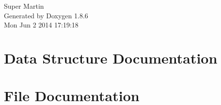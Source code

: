 \documentclass[twoside]{article}
\begin{document}
\hypersetup{pageanchor=false}
\begin{titlepage}
\vspace*{7cm}
\begin{center}%
{\Large Super Martin }\\
\vspace*{1cm}
{\large Generated by Doxygen 1.8.6}\\
\vspace*{0.5cm}
{\small Mon Jun 2 2014 17:19:18}\\
\end{center}
\end{titlepage}
\tableofcontents
{}
\hypersetup{pageanchor=true}

\section{Data Structure Documentation}












\section{File Documentation}







































\newpage
{}
{}
\printindex
\end{document}
